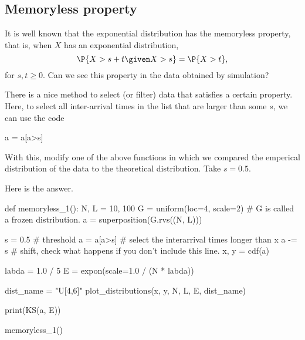 \subsection{Memoryless property}

It is well known that the exponential distribution has the memoryless property, that is, when $X$ has an exponential distribution,
\begin{equation*}
\P{X>s + t \given X> s} = \P{X>t},
\end{equation*}
for $s, t \geq 0$.
Can we see this property in the data obtained by  simulation?

\begin{exercise}
  There is a nice  method to select (or filter) data that satisfies a certain property.
  Here, to select all inter-arrival times in the list  that are larger than some $s$, we can use the code
  \begin{pynotangle}
    a = a[a>s]
  \end{pynotangle}
With this,  modify one of the above functions in which we compared the emperical distribution of the data to the theoretical distribution. Take $s=0.5$.

  \begin{solution}
Here is the answer.
\begin{pyverbatim}
def memoryless_1():
    N, L = 10, 100
    G = uniform(loc=4, scale=2)  # G is called a frozen distribution.
    a = superposition(G.rvs((N, L)))

    s = 0.5 # threshold
    a = a[a>s] # select the interarrival times longer than x
    a -= s  # shift, check what happens if you don't include this line.
    x, y = cdf(a)

    labda = 1.0 / 5
    E = expon(scale=1.0 / (N * labda))

    dist_name = "U[4,6]"
    plot_distributions(x, y, N, L, E, dist_name)

    print(KS(a, E))

memoryless_1()

\end{pyverbatim}
  \end{solution}
\end{exercise}

